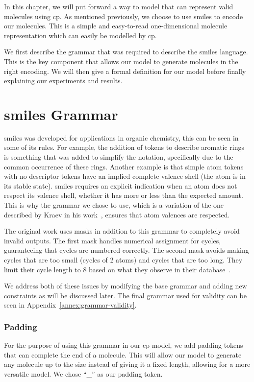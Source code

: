 \documentclass[../Document.tex]{subfiles}
\begin{document}
\label{chap:cp-validity}

In this chapter, we will put forward a way to model that can represent valid molecules using \gls{cp}.
As mentioned previously, we choose to use \gls{smiles} to encode our molecules. This is a simple and easy-to-read one-dimensional molecule representation which can easily be modelled by \gls{cp}.

We first describe the grammar that was required to describe the \gls{smiles} language. This is the key component that allows our model to generate molecules in the right encoding. We will then give a formal definition for our model before finally explaining our experiments and results.


\section{\gls{smiles} Grammar}
\label{sec:smiles-valid-grammar}
\gls{smiles} was developed for applications in organic chemistry, this can be seen in some of its rules. For example, the addition of tokens to describe aromatic rings is something that was added to simplify the notation, specifically due to the common occurrence of these rings. Another example is that simple atom tokens with no descriptor tokens have an implied complete valence shell (\ie the atom is in its stable state). \gls{smiles} requires an explicit indication when an atom does not respect its valence shell, whether it has more or less than the expected amount. This is why the grammar we chose to use, which is a variation of the one described by Kraev in his work~\cite{kraev2018grammars}, ensures that atom valences are respected.

The original work uses masks in addition to this grammar to completely avoid invalid outputs.
The first mask handles numerical assignment for cycles, guaranteeing that cycles are numbered correctly.
The second mask avoids making cycles that are too small (\ie cycles of 2 atoms) and cycles that are too long. They limit their cycle length to 8 based on what they observe in their database~\cite{kraev2018grammars}.

We address both of these issues by modifying the base grammar and adding new constraints as will be discussed later. The final grammar used for validity can be seen in Appendix~\ref{annex:grammar-validity}.

\subsubsection{Padding}
For the purpose of using this grammar in our \gls{cp} model, we add padding tokens that can complete the end of a molecule. 
This will allow our model to generate any molecule up to the size instead of giving it a fixed length, allowing for a more versatile model.
We chose ``\_'' as our padding token.
\end{document}
